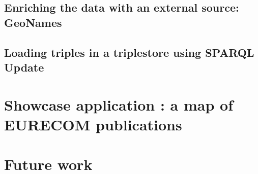 \documentclass[a4paper,11pt]{report}
\begin{document}
\section{Enriching the data with an external source: GeoNames}
\section{Loading triples in a triplestore using SPARQL Update}



\chapter{Showcase application : a map of EURECOM publications}



\chapter{Future work}

\end{document}
